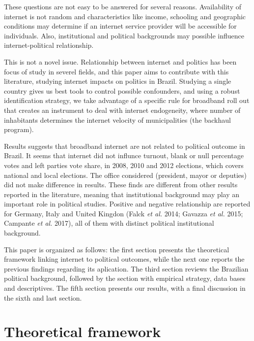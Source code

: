 \documentclass[12pt,]{article}
\begin{document}
These questions are not easy to be answered for several reasons.
Availability of internet is not random and characteristics like income,
schooling and geographic conditions may determine if an internet service
provider will be accessible for individuals. Also, institutional and
political backgrounds may possible influence internet-political
relationship.

This is not a novel issue. Relationship between internet and politics
has been focus of study in severel fields, and this paper aims to
contribute with this literature, studying internet impacts on politics
in Brazil. Studying a single country gives us best tools to control
possible confounders, and using a robust identification strategy, we
take advantage of a specific rule for broadband roll out that creates an
instrument to deal with internet endogeneity, where number of
inhabitants determines the internet velocity of municipalities (the
backhaul program).

Results suggests that broadband internet are not related to political
outcome in Brazil. It seems that internet did not influnce turnout,
blank or null percentage votes and left parties vote share, in 2008,
2010 and 2012 elections, which covers national and local elections. The
office considered (president, mayor or deputies) did not make difference
in results. These finds are different from other results reported in the
literature, meaning that institutional background may play an important
role in political studies. Positive and negative relationship are
reported for Germany, Italy and United Kingdon (Falck \emph{et al.}
2014; Gavazza \emph{et al.} 2015; Campante \emph{et al.} 2017), all of
them with distinct political institutional background.

This paper is organized as follows: the first section presents the
theoretical framework linking internet to political outcomes, while the
next one reports the previous findings regarding its aplication. The
third section reviews the Brazilian political background, followed by
the section with empirical strategy, data bases and descriptives. The
fifth section presents our results, with a final discussion in the sixth
and last section.

\hypertarget{theoretical-framework}{%
\section{Theoretical framework}\label{theoretical-framework}}
\end{document}
